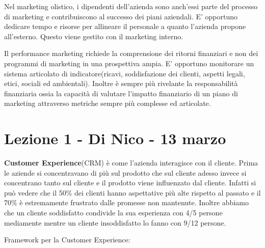 \documentclass[11pt]{article}
\begin{document}
Nel marketing olistico, i dipendenti dell'azienda sono anch'essi parte del processo di marketing e contribuiscono al successo dei piani aziendali. 
E' opportuno dedicare tempo e risorse per allineare il personale a quanto l'azienda propone all'esterno. Questo viene gestito con il marketing interno.

Il performance marketing richiede la comprensione dei ritorni finanziari e non dei programmi di marketing in una prospettiva ampia. 
E' opportuno monitorare un sistema articolato di indicatore(ricavi, soddisfazione dei clienti, aspetti legali, etici, sociali ed ambientali). 
Inoltre è sempre più rivelante la responsabilità finanziaria ossia la capacità di valutare l'impatto finanziario di un piano di marketing attraverso metriche sempre più complesse ed articolate.

\section{Lezione 1 - Di Nico - 13 marzo} %
\textbf{Customer Experience}(CRM) è come l'azienda interagisce con il cliente. Prima le aziende si concentravano di più sul prodotto che sul cliente adesso invece si concentrano tanto sul cliente e il prodotto viene influenzato dal cliente. Infatti si può vedere che il 50\% dei clienti hanno aspettative più alte rispetto al passato e il 70\% è estremamente frustrato dalle promesse non mantenute. Inoltre abbiamo che un cliente soddisfatto condivide la sua esperienza con 4/5 persone mediamente mentre un cliente insoddisfatto lo fanno con 9/12 persone.

Framework per la Customer Experience:
\end{document}
